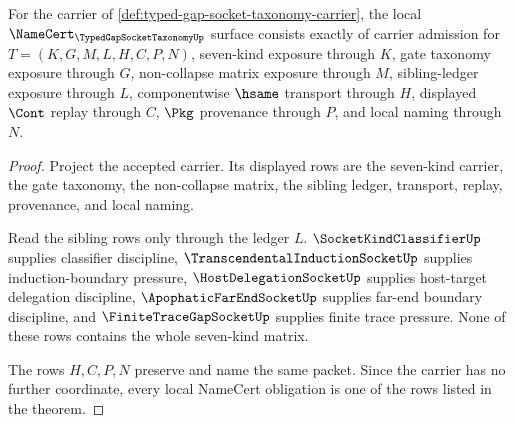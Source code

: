 \begin{theorem}
\label{thm:typed-gap-socket-taxonomy-namecert-obligations}
For the carrier of \autoref{def:typed-gap-socket-taxonomy-carrier}, the local $\NameCert_{\TypedGapSocketTaxonomyUp}$ surface consists exactly of carrier admission for $T=(K,G,M,L,H,C,P,N)$, seven-kind exposure through $K$, gate taxonomy exposure through $G$, non-collapse matrix exposure through $M$, sibling-ledger exposure through $L$, componentwise $\hsame$ transport through $H$, displayed $\Cont$ replay through $C$, $\Pkg$ provenance through $P$, and local naming through $N$.
\end{theorem}
\begin{proof}
Project the accepted carrier. Its displayed rows are the seven-kind carrier, the gate taxonomy, the non-collapse matrix, the sibling ledger, transport, replay, provenance, and local naming.

Read the sibling rows only through the ledger $L$. $\SocketKindClassifierUp$ supplies classifier discipline, $\TranscendentalInductionSocketUp$ supplies induction-boundary pressure, $\HostDelegationSocketUp$ supplies host-target delegation discipline, $\ApophaticFarEndSocketUp$ supplies far-end boundary discipline, and $\FiniteTraceGapSocketUp$ supplies finite trace pressure. None of these rows contains the whole seven-kind matrix.

The rows $H,C,P,N$ preserve and name the same packet. Since the carrier has no further coordinate, every local NameCert obligation is one of the rows listed in the theorem.
\end{proof}

